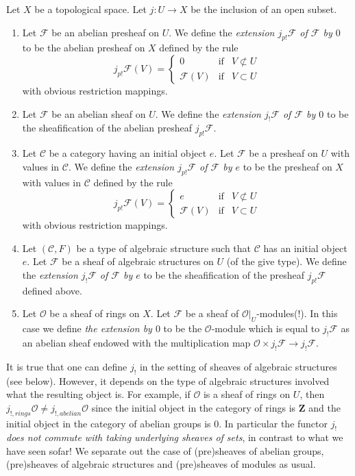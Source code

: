 \begin{definition}
\label{definition-j-shriek-structures}
Let $X$ be a topological space.
Let $j : U \to X$ be the inclusion of an open subset.
\begin{enumerate}
\item Let $\mathcal{F}$ be an abelian presheaf on $U$.
We define the {\it extension $j_{p!}\mathcal{F}$ of $\mathcal{F}$ by $0$}
to be the abelian presheaf on $X$ defined by the rule
$$
j_{p!}\mathcal{F}(V) =
\left\{
\begin{matrix}
0 & \text{if} & V \not \subset U \\
\mathcal{F}(V) & \text{if} & V \subset U 
\end{matrix}
\right.
$$
with obvious restriction mappings.
\item Let $\mathcal{F}$ be an abelian sheaf on $U$. We define
the {\it extension $j_!\mathcal{F}$ of $\mathcal{F}$ by $0$}
to be the sheafification of the abelian presheaf $j_{p!}\mathcal{F}$.
\item Let $\mathcal{C}$ be a category having an initial object $e$.
Let $\mathcal{F}$ be a presheaf on $U$ with values in $\mathcal{C}$.
We define the {\it extension $j_{p!}\mathcal{F}$ of $\mathcal{F}$ by $e$}
to be the presheaf on $X$ with values in $\mathcal{C}$ defined by the
rule
$$
j_{p!}\mathcal{F}(V) =
\left\{
\begin{matrix}
e & \text{if} & V \not \subset U \\
\mathcal{F}(V) & \text{if} & V \subset U 
\end{matrix}
\right.
$$
with obvious restriction mappings.
\item Let $(\mathcal{C}, F)$ be a type of algebraic structure
such that $\mathcal{C}$ has an initial object $e$.
Let $\mathcal{F}$ be a sheaf of algebraic structures on $U$
(of the give type). We define the
{\it extension $j_!\mathcal{F}$ of $\mathcal{F}$ by $e$}
to be the sheafification of the presheaf $j_{p!}\mathcal{F}$
defined above.
\item Let $\mathcal{O}$ be a sheaf of rings on $X$.
Let $\mathcal{F}$ be a sheaf of $\mathcal{O}|_U$-modules(!).
In this case we define {\it the extension by $0$}
to be the $\mathcal{O}$-module which is equal to
$j_!\mathcal{F}$ as an abelian sheaf endowed with
the multiplication map $\mathcal{O} \times j_!\mathcal{F} \to j_!\mathcal{F}$.
\end{enumerate}
\end{definition}

\noindent
It is true that one can define $j_!$ in the setting of sheaves
of algebraic structures (see below). However, it depends on the
type of algebraic structures involved what the resulting
object is. For example, if $\mathcal{O}$ is a sheaf of rings
on $U$, then $j_{!, rings}\mathcal{O} \not = j_{!, abelian}\mathcal{O}$
since the initial object in the category of rings
is $\mathbf{Z}$ and the initial object in the category
of abelian groups is $0$. In particular the functor $j_!$
{\it does not commute with taking underlying sheaves of sets},
in contrast to what we have seen sofar! We separate out the case
of (pre)sheaves of abelian groups, (pre)sheaves of algebraic structures
and (pre)sheaves of modules as usual.

